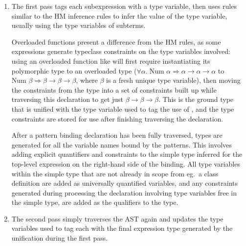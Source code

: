 \documentclass[dissertation.tex]{subfiles}
\begin{document}
{{        \begin{enumerate}
        \item
        {
            The first pass tags each subexpression with a type variable, then uses rules similar to the HM inference rules to infer the value of the type variable, usually using the type variables of subterms.
            
            Overloaded functions present a difference from the HM rules, as some expressions generate typeclass constraints on the type variables involved: using an overloaded function like \haskell{(+)} will first require instantiating its polymorphic type to an overloaded type (\(\forall\alpha.\;\text{Num }\alpha\Rightarrow\alpha\rightarrow\alpha\rightarrow\alpha\) to \(\text{Num }\beta\Rightarrow\beta\rightarrow\beta\rightarrow\beta\), where \(\beta\) is a fresh unique type variable), then moving the constraints from the type into a set of constraints built up while traversing this declaration to get just \(\beta\rightarrow\beta\rightarrow\beta\). This is the ground type that is unified with the type variable used to tag the use of \haskell{(+)}, and the type constraints are stored for use after finishing traversing the declaration.

            After a pattern binding declaration has been fully traversed, types are generated for all the variable names bound by the patterns. This involves adding explicit quantifiers and constraints to the simple type inferred for the top-level expression on the right-hand side of the binding. All type variables within the simple type that are not already in scope from eg.\ a class definition are added as universally quantified variables, and any constraints generated during processing the declaration involving type variables free in the simple type, are added as the qualifiers to the type.
        }
        \item
        {
            The second pass simply traverses the AST again and updates the type variables used to tag each with the final expression type generated by the unification during the first pass.
            
}
\end{enumerate}}}
\end{document}
